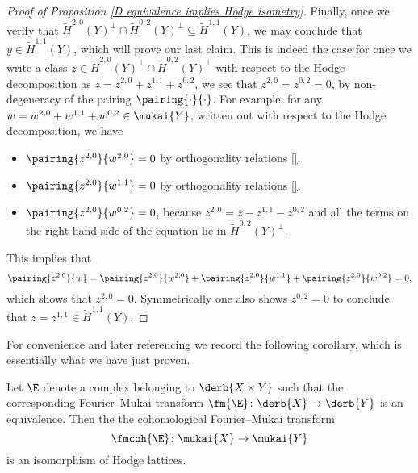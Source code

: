 \begin{proof}[Proof of Proposition \ref{D equivalence implies Hodge isometry}]
    Finally, once we verify that $\widetilde{H}^{2,0}(Y)^\perp \cap \widetilde{H}^{0,2}(Y)^\perp \subseteq \widetilde{H}^{1,1}(Y)$, we may conclude that $y \in \widetilde{H}^{1,1}(Y)$, which will prove our last claim.
    This is indeed the case for once we write a class $z \in \widetilde{H}^{2,0}(Y)^\perp \cap \widetilde{H}^{0,2}(Y)^\perp$ with respect to the Hodge decomposition as $z = z^{2,0} + z^{1,1} + z^{0,2}$, we see that $z^{2,0} = z^{0,2} = 0$, by non-degeneracy of the pairing $\pairing{\cdot}{\cdot}$. For example, for any $w = w^{2,0} + w^{1,1} + w^{0,2} \in \mukai{Y}$, written out with respect to the Hodge decomposition, we have 
    \begin{itemize}[label = $\circ$ ]
        \item{$\pairing{z^{2,0}}{w^{2,0}} = 0$ by orthogonality relations \eqref{}.
        }
        \item{
            $\pairing{z^{2,0}}{w^{1,1}} = 0$ by orthogonality relations \eqref{}.
        }
        \item{
            $\pairing{z^{2,0}}{w^{0,2}} = 0$, because $z^{2,0} = z - z^{1,1} - z^{0,2}$ and all the terms on the right-hand side of the equation lie in $\widetilde{H}^{0,2}(Y)^\perp$.
        }
    \end{itemize}
    This implies that
    \[
        \pairing{z^{2,0}}{w} = \pairing{z^{2,0}}{w^{2,0}} + \pairing{z^{2,0}}{w^{1,1}} + \pairing{z^{2,0}}{w^{0,2}} = 0,
    \]
    which shows that $z^{2,0} = 0$. Symmetrically one also shows $z^{0,2} = 0$ to conclude that $z = z^{1,1} \in \widetilde{H}^{1,1}(Y)$. \qedhere
    
    
    
    
\end{proof}

For convenience and later referencing we record the following corollary, which is essentially what we have just proven. 

\begin{corollary}
    \label{FM equivalence implies FM on Mukai is an isomorphism}
    Let $\E$ denote a complex belonging to $\derb{X \times Y}$ such that the corresponding Fourier--Mukai transform $\fm{\E} \colon \derb{X} \to \derb{Y}$ is an equivalence. Then the the cohomological Fourier--Mukai transform
    \[
        \fmcoh{\E} \colon \mukai{X} \to \mukai{Y}
    \]
    is an isomorphism of Hodge lattices.
\end{corollary}







